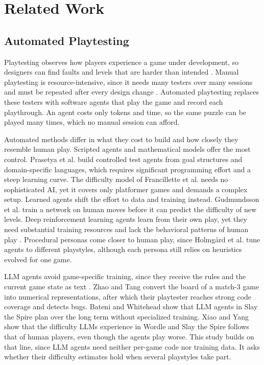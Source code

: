 \documentclass[conference]{IEEEtran}
\begin{document}
\section{Related Work}
\label{sec:related}

\subsection{Automated Playtesting}
Playtesting observes how players experience a game under development, so designers can find faults and levels that are harder than intended \cite{weber2020}. Manual playtesting is resource-intensive, since it needs many testers over many sessions and must be repeated after every design change \cite{prasetya2026,zhao2025}. Automated playtesting replaces these testers with software agents that play the game and record each playthrough. An agent costs only tokens and time, so the same puzzle can be played many times, which no manual session can afford.

Automated methods differ in what they cost to build and how closely they resemble human play. Scripted agents and mathematical models offer the most control. Prasetya et al. \cite{prasetya2026} build controlled test agents from goal structures and domain-specific languages, which requires significant programming effort and a steep learning curve. The difficulty model of Francillette et al. \cite{francillette2025} needs no sophisticated AI, yet it covers only platformer games and demands a complex setup. Learned agents shift the effort to data and training instead. Gudmundsson et al. \cite{gudmundsson2018} train a network on human moves before it can predict the difficulty of new levels. Deep reinforcement learning agents learn from their own play, yet they need substantial training resources and lack the behavioral patterns of human play \cite{delfosse2025}. Procedural personas come closer to human play, since Holmgård et al. \cite{holmgard2019} tune agents to different playstyles, although each persona still relies on heuristics evolved for one game.

LLM agents avoid game-specific training, since they receive the rules and the current game state as text \cite{xiao2025}. Zhao and Tang \cite{zhao2025} convert the board of a match-3 game into numerical representations, after which their playtester reaches strong code coverage and detects bugs. Bateni and Whitehead \cite{bateni2024} show that LLM agents in Slay the Spire plan over the long term without specialized training. Xiao and Yang \cite{xiao2025} show that the difficulty LLMs experience in Wordle and Slay the Spire follows that of human players, even though the agents play worse. This study builds on that line, since LLM agents need neither per-game code nor training data. It asks whether their difficulty estimates hold when several playstyles take part.
\end{document}
